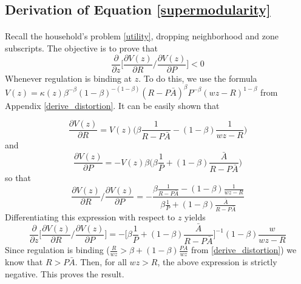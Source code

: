 \documentclass[12pt]{article}
\begin{document}
	\clearpage
	\subsection{Derivation of Equation \eqref{supermodularity}}\label{derive_supermodularity} 
	
	\paragraph*{}
	Recall the household's problem \eqref{utility}, dropping neighborhood and zone subscripts. The objective is to prove that 
	\begin{equation}
		\frac{\partial}{\partial z}\bigg[\frac{\partial V(z)}{\partial R}/\frac{\partial V(z)}{\partial P}\bigg] < 0
	\end{equation}
	Whenever regulation is binding at $z$. To do this, we use the formula $V(z) = \kappa(z)\beta^{-\beta}(1-\beta)^{-(1-\beta)}(R - P\bar{A})^{\beta}P^{-\beta}(wz - R)^{1-\beta}$ from Appendix \ref{derive_distortion}. It can be easily shown that 
	
	\begin{equation*}
		\frac{\partial V(z)}{\partial R} = V(z)\bigg(\beta\frac{1}{R - P\bar{A}} - (1-\beta)\frac{1}{wz - R} \bigg)
	\end{equation*}
	and 
	\begin{equation*}
		\frac{\partial V(z)}{\partial P} = -V(z)\beta\bigg(\beta\frac{1}{P} + (1-\beta)\frac{\bar{A}}{R - P\bar{A}}  \bigg)
	\end{equation*}
	so that
	\begin{equation}
		\frac{\partial V(z)}{\partial R}/\frac{\partial V(z)}{\partial P} = -\frac{\beta\frac{1}{R - P\bar{A}} - (1-\beta)\frac{1}{wz - R} }{\beta\frac{1}{P} + (1-\beta)\frac{\bar{A}}{R - P\bar{A}} }
	\end{equation}
	Differentiating this expression with respect to $z$ yields 
	\begin{equation}
		\frac{\partial}{\partial z}\bigg[\frac{\partial V(z)}{\partial R}/\frac{\partial V(z)}{\partial P}\bigg] = -\bigg[\beta\frac{1}{P} + (1-\beta)\frac{\bar{A}}{R - P\bar{A}}\bigg]^{-1}(1-\beta)\frac{w}{wz - R}
	\end{equation}
	Since regulation is binding ($\frac{R}{wz} > \beta + (1 - \beta)\frac{P \bar{A}}{wz}$ from \ref{derive_distortion}) we know that $R > P\bar{A}$. Then, for all $wz > R$, the above expression is strictly negative.  This proves the result.
	
	\clearpage
	
\end{document}
